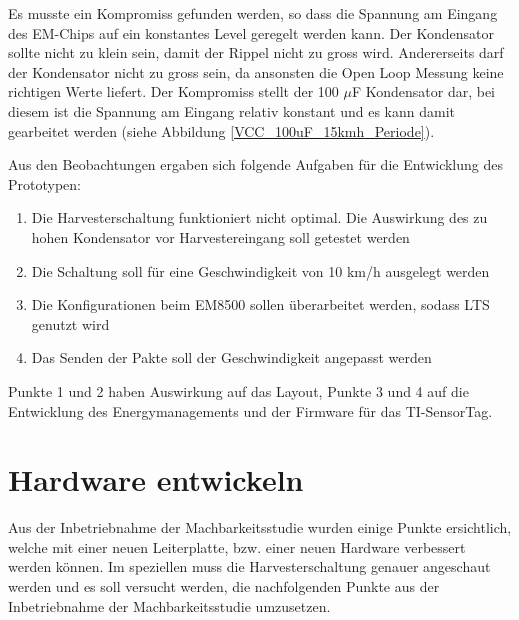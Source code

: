Es musste ein Kompromiss gefunden werden, so dass die Spannung am Eingang des EM-Chips auf ein konstantes Level geregelt werden kann. Der Kondensator sollte nicht zu klein sein, damit der Rippel nicht zu gross wird. Andererseits darf der Kondensator nicht zu gross sein, da ansonsten die Open Loop Messung keine richtigen Werte liefert. Der Kompromiss stellt der 100 $\mu$F Kondensator dar, bei diesem ist die Spannung am Eingang relativ konstant und es kann damit gearbeitet werden (siehe Abbildung \ref{VCC_100uF_15kmh_Periode}).



Aus den Beobachtungen ergaben sich folgende Aufgaben für die Entwicklung des Prototypen:

\begin{enumerate}
    \item Die Harvesterschaltung funktioniert nicht optimal. Die Auswirkung des zu hohen Kondensator vor Harvestereingang soll getestet werden
    \item Die Schaltung soll für eine Geschwindigkeit von 10 km/h ausgelegt werden
    \item Die Konfigurationen beim EM8500 sollen überarbeitet werden, sodass LTS genutzt wird
    \item Das Senden der Pakte soll der Geschwindigkeit angepasst werden
\end{enumerate}

Punkte 1 und 2 haben Auswirkung auf das Layout, Punkte 3 und 4 auf die Entwicklung des Energymanagements und der Firmware für das TI-SensorTag.








\section{Hardware entwickeln}

Aus der Inbetriebnahme der Machbarkeitsstudie wurden einige Punkte ersichtlich, welche mit einer neuen Leiterplatte, bzw. einer neuen Hardware verbessert werden können. Im speziellen muss die Harvesterschaltung genauer angeschaut werden und es soll versucht werden, die nachfolgenden Punkte aus der Inbetriebnahme der Machbarkeitsstudie umzusetzen. 

